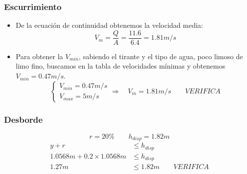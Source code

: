 \subsubsection*{Escurrimiento}

\begin{itemize}
 \item De la ecuación de continuidad obtenemos la velocidad media:
    \begin{equation*}
    V_{m} = \dfrac{Q}{A} = \dfrac{11.6}{6.4} = 1.81 m/s
    \end{equation*}
 \item Para obtener la $V_{min}$, sabiendo el tirante y el tipo de agua, poco limoso de limo fino, buscamos en
 la tabla de velocidades mínimas y obtenemos $V_{min} = 0.47 m/s$.
    \begin{equation*}
      \begin{cases}
      V_{min} = 0.47 m/s \\
      V_{max} = 5 m/s
      \end{cases}
      \Longrightarrow \quad
      V_{m} = 1.81 m/s
      \qquad
      VERIFICA
    \end{equation*}
\end{itemize}

\subsubsection*{Desborde}

\begin{equation*}
 r = 20\%
 \qquad
 h_{disp} = 1.82 m
\end{equation*}
\begin{align*}
 y + r &\leq h_{disp} \\
 1.0568 m + 0.2 \times 1.0568 m &\leq h_{disp} \\
 1.27 m &\leq 1.82 m
 \qquad
 VERIFICA
\end{align*}

